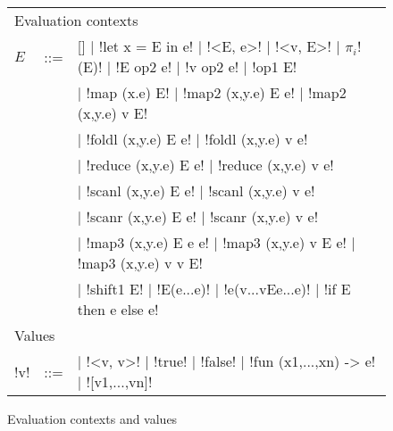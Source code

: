 \begin{figure*}[t]
    \begin{tabular}{|l c l|}
        \hline
        \multicolumn{3}{|l|}{Evaluation contexts} \\
        $E$ & \mbox{::=} & 
        [] 
        $\mid$ !let x = E in e! 
        $\mid$ !<E, e>!
        $\mid$ !<v, E>!
        $\mid$ $\pi_i$!(E)!
        $\mid$ !E op2 e!
        $\mid$ !v op2 e!
        $\mid$ !op1 E! \\
        && $\mid$ !map (x.e) E!
        $\mid$ !map2 (x,y.e) E e!
        $\mid$ !map2 (x,y.e) v E! \\
        && $\mid$ !foldl (x,y.e) E e!
        $\mid$ !foldl (x,y.e) v e! \\
        && $\mid$ !reduce (x,y.e) E e! 
        $\mid$ !reduce (x,y.e) v e! \\
        && $\mid$ !scanl (x,y.e) E e!
        $\mid$ !scanl (x,y.e) v e! \\
        && $\mid$ !scanr (x,y.e) E e!
        $\mid$ !scanr (x,y.e) v e! \\
        && $\mid$ !map3 (x,y.e) E e e!
        $\mid$ !map3 (x,y.e) v E e!
        $\mid$ !map3 (x,y.e) v v E! \\
        && $\mid$ !shift1 E!
        $\mid$ !E(e...e)!
        $\mid$ !e(v...vEe...e)!
        $\mid$ !if E then e else e!
        \\ \hline
        \multicolumn{3}{|l|}{Values} \\ 
        !v! & \mbox{::=} & 
        \cnst{}  
        $\mid$ !<v, v>!
        $\mid$ !true! 
        $\mid$ !false!
        $\mid$ !fun (x1,...,xn) -> e!
        $\mid$ ![v1,...,vn]! 
        \\ \hline
        \end{tabular}
    \caption{Evaluation contexts and values}
\label{fig:diff_macro}    \end{figure*}